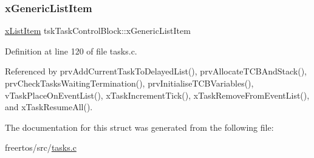 \subsubsection{\texorpdfstring{x\+Generic\+List\+Item}{xGenericListItem}}
{\footnotesize\ttfamily \hyperlink{list_8h_abc3e65a10b5c5f39142e64e69311797f}{x\+List\+Item} tsk\+Task\+Control\+Block\+::x\+Generic\+List\+Item}



Definition at line 120 of file tasks.\+c.



Referenced by prv\+Add\+Current\+Task\+To\+Delayed\+List(), prv\+Allocate\+T\+C\+B\+And\+Stack(), prv\+Check\+Tasks\+Waiting\+Termination(), prv\+Initialise\+T\+C\+B\+Variables(), v\+Task\+Place\+On\+Event\+List(), x\+Task\+Increment\+Tick(), x\+Task\+Remove\+From\+Event\+List(), and x\+Task\+Resume\+All().



The documentation for this struct was generated from the following file\+:\begin{DoxyCompactItemize}
\item 
freertos/src/\hyperlink{tasks_8c}{tasks.\+c}\end{DoxyCompactItemize}
